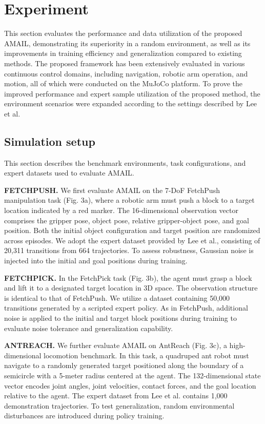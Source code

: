 \documentclass[lettersize,journal]{IEEEtran}
\begin{document}
\section{Experiment}

This section evaluates the performance and data utilization of the proposed AMAIL, demonstrating its superiority in a random environment, as well as its improvements in training efficiency and generalization compared to existing methods. The proposed framework has been extensively evaluated in various continuous control domains, including navigation, robotic arm operation, and motion, all of which were conducted on the MuJoCo platform. To prove the improved performance and expert sample utilization of the proposed method, the environment scenarios were expanded according to the settings described by Lee et al.
\subsection{Simulation setup}
This section describes the benchmark environments, task configurations, and expert datasets used to evaluate AMAIL.

\textbf{FETCHPUSH.} We first evaluate AMAIL on the 7-DoF FetchPush manipulation task (Fig. 3a), where a robotic arm must push a block to a target location indicated by a red marker. The 16-dimensional observation vector comprises the gripper pose, object pose, relative gripper-object pose, and goal position. Both the initial object configuration and target position are randomized across episodes. We adopt the expert dataset provided by Lee et al., consisting of 20,311 transitions from 664 trajectories. To assess robustness, Gaussian noise is injected into the initial and goal positions during training.

\textbf{FETCHPICK.} In the FetchPick task (Fig. 3b), the agent must grasp a block and lift it to a designated target location in 3D space. The observation structure is identical to that of FetchPush. We utilize a dataset containing 50,000 transitions generated by a scripted expert policy. As in FetchPush, additional noise is applied to the initial and target block positions during training to evaluate noise tolerance and generalization capability.

\textbf{ANTREACH.} We further evaluate AMAIL on AntReach (Fig. 3c), a high-dimensional locomotion benchmark. In this task, a quadruped ant robot must navigate to a randomly generated target positioned along the boundary of a semicircle with a 5-meter radius centered at the agent. The 132-dimensional state vector encodes joint angles, joint velocities, contact forces, and the goal location relative to the agent. The expert dataset from Lee et al. contains 1,000 demonstration trajectories. To test generalization, random environmental disturbances are introduced during policy training.
\end{document}
